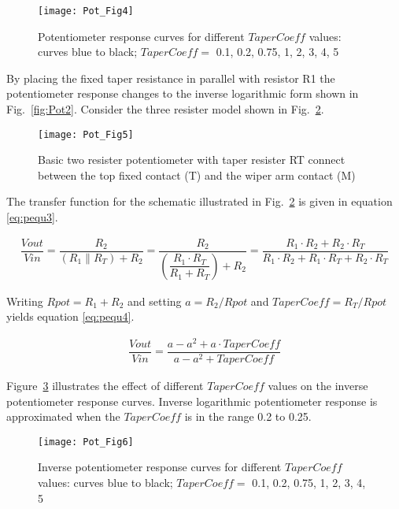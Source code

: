 \begin{figure} [here]
  \centering
  \texttt{[image: Pot\_Fig4]}
  \caption{Potentiometer response curves for different $TaperCoeff$ values: curves blue to black; $TaperCoeff =$ 0.1, 0.2, 0.75, 1, 2, 3, 4, 5}
  \label{fig:Pot4}
\end{figure} 


By placing the fixed taper resistance in parallel with resistor R1 the
potentiometer response changes to the inverse logarithmic form shown
in Fig.~\ref{fig:Pot2}. Consider the three resister model shown in
Fig.~\ref{fig:Pot5}.


\begin{figure} [here]
  \centering
  \texttt{[image: Pot\_Fig5]}
  \caption{Basic two resister potentiometer with taper resister RT connect between the top fixed contact (T) and the wiper arm contact (M)}
  \label{fig:Pot5}
\end{figure} 
\medskip 

The transfer function for the schematic illustrated in
Fig.~\ref{fig:Pot5} is given in equation \eqref{eq:pequ3}.

\begin{align}
\label{eq:pequ3}
\dfrac{Vout}{Vin}=\dfrac{R_{2}} { \left( R_{1} \parallel R_{T} \right) + R_{2}}
                 =\dfrac{R_{2}} { \left( \dfrac{ R_{1} \cdot R_{T} } {R_{1} + R_{T} } \right)  + R_{2}  } 
                 =\dfrac{R_{1} \cdot R_{2} + R_{2} \cdot R_{T}}{R_{1} \cdot R_{2}+ R_{1} \cdot R_{T} + R_{2} \cdot R_{T}}
\end{align}  

Writing $Rpot=R_{1}+R_{2}$ and setting $a=R_{2}/Rpot$ and
$TaperCoeff=R_{T}/Rpot$ yields equation \eqref{eq:pequ4}.

\begin{align}
\label{eq:pequ4}
\dfrac{Vout}{Vin}=\dfrac{a - a^{2} + a\cdot TaperCoeff }{a - a^{2} + TaperCoeff}
\end{align}  

Figure~\ref{fig:Pot6} illustrates the effect of different $TaperCoeff$
values on the inverse potentiometer response curves.  Inverse
logarithmic potentiometer response is approximated when the
$TaperCoeff$ is in the range 0.2 to 0.25.


\begin{figure} [here] 
  \centering
  \texttt{[image: Pot\_Fig6]}
  \caption{Inverse potentiometer response curves for different $TaperCoeff$ values: curves blue to black; $TaperCoeff =$ 0.1, 0.2, 0.75, 1, 2, 3, 4, 5}
  \label{fig:Pot6}
\end{figure} 



